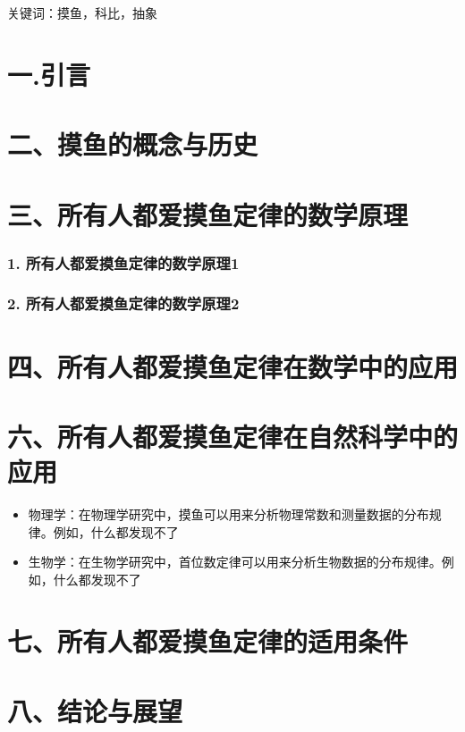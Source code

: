 \documentclass[winfonts, thesis]{njuthesis}
\begin{document}
关键词：摸鱼，科比，抽象

\section*{一.引言}



\section*{二、摸鱼的概念与历史}

\section*{三、所有人都爱摸鱼定律的数学原理}

\subsubsection*{1. 所有人都爱摸鱼定律的数学原理1}

\subsubsection*{2. 所有人都爱摸鱼定律的数学原理2}

\section*{四、所有人都爱摸鱼定律在数学中的应用}



\section*{六、所有人都爱摸鱼定律在自然科学中的应用}

\begin{itemize}
  \item 物理学：在物理学研究中，摸鱼可以用来分析物理常数和测量数据的分布规律。例如，什么都发现不了
  \item 生物学：在生物学研究中，首位数定律可以用来分析生物数据的分布规律。例如，什么都发现不了
\end{itemize}

\section*{七、所有人都爱摸鱼定律的适用条件}

\section*{八、结论与展望 }



%


\end{document}
